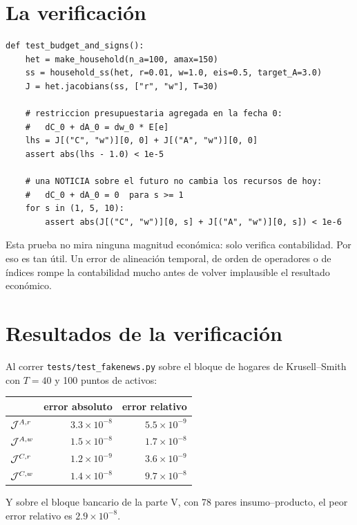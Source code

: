 \section{La verificación}

\begin{lstlisting}
def test_budget_and_signs():
    het = make_household(n_a=100, amax=150)
    ss = household_ss(het, r=0.01, w=1.0, eis=0.5, target_A=3.0)
    J = het.jacobians(ss, ["r", "w"], T=30)

    # restriccion presupuestaria agregada en la fecha 0:
    #   dC_0 + dA_0 = dw_0 * E[e]
    lhs = J[("C", "w")][0, 0] + J[("A", "w")][0, 0]
    assert abs(lhs - 1.0) < 1e-5

    # una NOTICIA sobre el futuro no cambia los recursos de hoy:
    #   dC_0 + dA_0 = 0  para s >= 1
    for s in (1, 5, 10):
        assert abs(J[("C", "w")][0, s] + J[("A", "w")][0, s]) < 1e-6
\end{lstlisting}

Esta prueba no mira ninguna magnitud económica: solo verifica contabilidad. Por
eso es tan útil. Un error de alineación temporal, de orden de operadores o de
índices rompe la contabilidad mucho antes de volver implausible el resultado
económico.

\section{Resultados de la verificación}

Al correr \texttt{tests/test\_fakenews.py} sobre el bloque de hogares de
Krusell--Smith con $T=40$ y 100 puntos de activos:

\begin{center}\small
\begin{tabular}{@{}lrr@{}}
\toprule
& \textbf{error absoluto} & \textbf{error relativo}\\
\midrule
$\mathcal{J}^{A,r}$ & $3.3\times10^{-8}$ & $5.5\times10^{-9}$\\
$\mathcal{J}^{A,w}$ & $1.5\times10^{-8}$ & $1.7\times10^{-8}$\\
$\mathcal{J}^{C,r}$ & $1.2\times10^{-9}$ & $3.6\times10^{-9}$\\
$\mathcal{J}^{C,w}$ & $1.4\times10^{-8}$ & $9.7\times10^{-8}$\\
\bottomrule
\end{tabular}
\end{center}

Y sobre el bloque bancario de la parte V, con 78 pares insumo--producto, el peor
error relativo es $2.9\times10^{-8}$.
